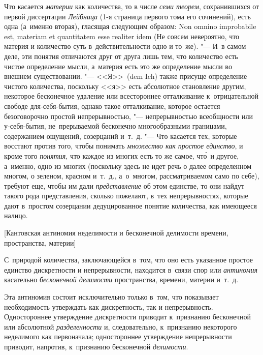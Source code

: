 Что касается {\em материи} как количества, то в числе {\em семи теорем},
сохранившихся от первой диссертации {\em Лейбница} (1-я страница первого тома его сочинений), есть одна
(а~именно вторая), гласящая следующим образом: Non omnino impro\-babi\-le est,
mate\-riam et quanti\-tatem esse reali\-ter idem (Не совсем невероятно, что
материя и количество суть в~действительности одно и то~же). "--- И~в самом
деле, эти понятия отличаются друг от друга лишь тем, что количество есть
чистое определение мысли, а~материя есть это же определение мысли во внешнем
существовании. "--- <<Я>>~(dem Ich) также присуще определение чистого
количества, поскольку <<я>> есть абсолютное становление другим, некоторое
бесконечное удаление или всестороннее отталкивание к~отрицательной свободе
для-себя-бытия, однако такое отталкивание, которое остается безоговорочно
простой непрерывностью, "--- непрерывностью всеобщности или у-себя-бытия,
не~прерываемой бесконечно многообразными границами, содержанием ощущений,
созерцаний и~т.~д. "--- Что касается тех, которые восстают против того, чтобы
понимать {\em множество как простое единство}, и кроме того {\em понятия}, что
каждое из многих есть то же самое, чт\'{о}~и другое, а~именно, одно из многих
(поскольку здесь не идет речь о далее определенном многом, о зеленом, красном
и~т.~д., а~о~многом, рассматриваемом само по себе), требуют еще, чтобы им дали
{\em представление} об этом единстве, то они найдут такого рода представления,
сколько пожелают, в~тех непрерывностях, которые дают в~простом созерцании
дедуцированное понятие количества, как имеющееся налицо.

%
{[Кантовская антиномия неделимости и бесконечной делимости времени,
пространства, материи]}

\label{bkm:bm88a}С~природой количества, заключающейся в~том, что оно есть
указанное простое единство дискретности и непрерывности, находится в~связи спор
или {\em антиномия} касательно {\em бесконечной делимости} пространства,
времени, материи и~т.~д.

Эта антиномия состоит исключительно только в~том, что показывает необходимость
утверждать как дискретность, так и непрерывность. Одностороннее утверждение
дискретности приводит к~признанию бесконечной или абсолютной
{\em разделенности} и, следовательно, к~признанию некоторого неделимого как
первоначала; одностороннее утверждение непрерывности приводит, напротив,
к~признанию бесконечной {\em делимости}.

